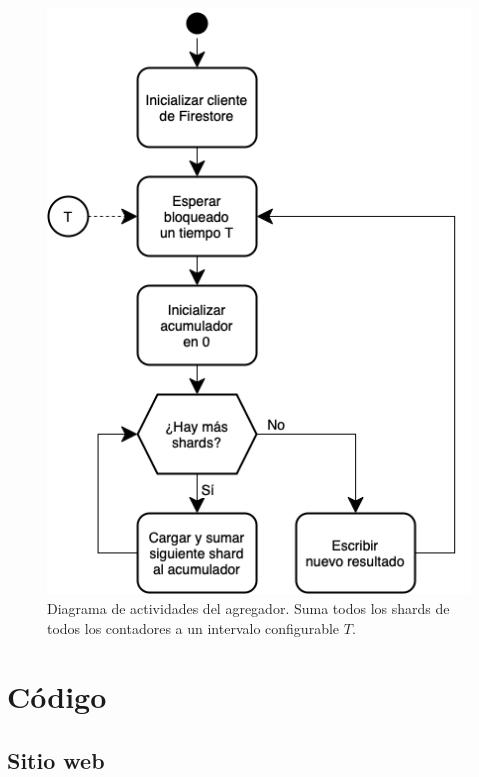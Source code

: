 \documentclass[11pt]{scrartcl}
\begin{document}
\begin{figure}
\begin{center}
\includegraphics[scale=0.7]{img/aggregator-activity}
\end{center}
\caption{Diagrama de actividades del agregador. Suma todos los shards de todos los contadores a un intervalo configurable $T$.}
\label{fig:aggregator-activity}
\end{figure}

\section{Código}\label{sec:code}

\subsection{Sitio web}
\end{document}
